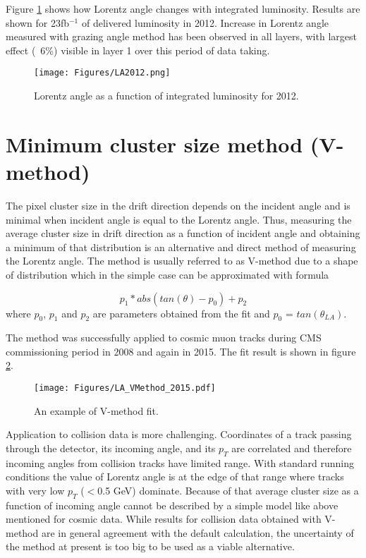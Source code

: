 Figure \ref{fig:La2012} shows how Lorentz angle changes with integrated luminosity. Results are shown for 23fb$^{-1}$ of delivered luminosity in 2012. Increase in Lorentz angle measured with grazing angle method has been observed in all layers, with largest effect (~6\%) visible in layer 1 over this period of data taking.  
\begin{figure}[ht!]
\centering
\texttt{[image: Figures/LA2012.png]}
\caption{Lorentz angle as a function of integrated luminosity for 2012.}
\label{fig:La2012}
\end{figure}

\section{Minimum cluster size method (V-method)}
The pixel cluster size in the drift direction depends on the incident
angle and is minimal when incident angle is equal to the Lorentz angle. Thus, measuring the average cluster size in drift direction as a function of incident angle and obtaining a minimum of that
distribution is an alternative and direct method of measuring the Lorentz angle. The method is usually referred to as V-method due
to a shape of distribution which in the simple case can be approximated with formula

\begin{equation}
p_1*abs(tan(\theta) - p_0) + p_2
\end{equation}
where $p_0$, $p_1$ and $p_2$ are parameters obtained from the fit and $p_0$ = $tan(\theta_{LA})$.

The method was successfully applied to cosmic muon tracks during CMS commissioning period in 2008 and again in 2015. The fit result is shown in figure \ref{fig:LA_VMethod}.

\begin{figure}[hbtp!]
	\centering
	\texttt{[image: Figures/LA\_VMethod\_2015.pdf]}
	\caption{An example of V-method fit.}
	\label{fig:LA_VMethod}
\end{figure}

Application to collision data is more challenging. Coordinates of a track passing through the detector, its incoming angle, and its $p_T$ are
correlated and therefore incoming angles from collision tracks have limited range. With
standard running conditions the value of Lorentz angle is at the edge of that range where tracks with very low $p_T$ ($<$0.5 GeV) dominate. Because
of that average cluster size as a function of incoming angle cannot be described by a simple model like above mentioned for cosmic data.
While  results for collision data obtained with V-method are in general agreement with the default calculation,  the uncertainty of
the method at present is too big to be used as a viable alternative.

